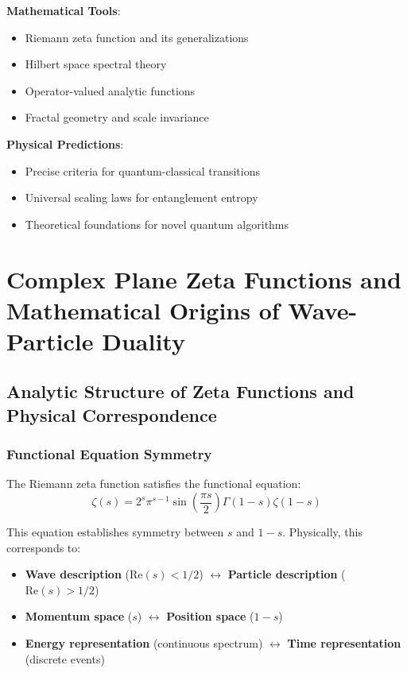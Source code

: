 \documentclass[11pt]{article}
\theoremstyle{plain}
\theoremstyle{definition}
\theoremstyle{remark}
\begin{document}
\textbf{Mathematical Tools}:
\begin{itemize}
\item Riemann zeta function and its generalizations
\item Hilbert space spectral theory
\item Operator-valued analytic functions
\item Fractal geometry and scale invariance
\end{itemize}

\textbf{Physical Predictions}:
\begin{itemize}
\item Precise criteria for quantum-classical transitions
\item Universal scaling laws for entanglement entropy
\item Theoretical foundations for novel quantum algorithms
\end{itemize}

\section{Complex Plane Zeta Functions and Mathematical Origins of Wave-Particle Duality}

\subsection{Analytic Structure of Zeta Functions and Physical Correspondence}

\subsubsection{Functional Equation Symmetry}

The Riemann zeta function satisfies the functional equation:
$$\zeta(s) = 2^s \pi^{s-1} \sin\left(\frac{\pi s}{2}\right) \Gamma(1-s) \zeta(1-s)$$

This equation establishes symmetry between $s$ and $1-s$. Physically, this corresponds to:
\begin{itemize}
\item \textbf{Wave description} ($\text{Re}(s) < 1/2$) $\leftrightarrow$ \textbf{Particle description} ($\text{Re}(s) > 1/2$)
\item \textbf{Momentum space} ($s$) $\leftrightarrow$ \textbf{Position space} ($1-s$)
\item \textbf{Energy representation} (continuous spectrum) $\leftrightarrow$ \textbf{Time representation} (discrete events)
\end{itemize}
\end{document}
